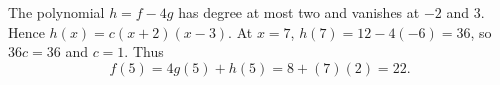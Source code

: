 The polynomial $h=f-4g$ has degree at most two and vanishes at $-2$ and $3$. Hence $h(x)=c(x+2)(x-3)$. At $x=7$, $h(7)=12-4(-6)=36$, so $36c=36$ and $c=1$. Thus
\[
f(5)=4g(5)+h(5)=8+(7)(2)=\boxed{22}.
\]
